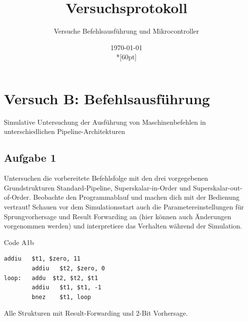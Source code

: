 \documentclass[a4paper,12pt,titlepage]{scrartcl}
\begin{document}
\titlehead
{
    \small
    {
        Technische Universität Ilmenau\\
        Fakulät IA\\
        Fachgebiet Rechnerarchitektur\\

        Praktikum Rechnerarchitektur 2\\
        WS 2021/22}
}

\title {Versuchsprotokoll}
\subtitle{Versuche Befehlsausführung und Mikrocontroller}
\author{}
\date{\today\\*[60pt]}
\maketitle  %

\pagestyle{fancy}
\newpage

\section*{Versuch B: Befehlsausführung}
Simulative Untersuchung der Ausführung von Maschinenbefehlen in unterschiedlichen Pipeline-Architekturen

\subsection*{Aufgabe 1}
Untersuchen die vorbereitete Befehlsfolge mit den drei vorgegebenen Grundstrukturen Standard-Pipeline, Superskalar-in-Order und Superskalar-out-of-Order. Beobachte den Programmablauf und machen dich mit der Bedienung vertraut! Schauen vor dem Simulationsstart auch die Parametereinstellungen für Sprungvorhersage und Result Forwarding an (hier können auch Änderungen vorgenommen werden) und interpretiere das Verhalten während der Simulation.

Code A1b
\begin{lstlisting}[basicstyle=\tiny]
        addiu   $t1, $zero, 11
        addiu   $t2, $zero, 0
loop:   addu  $t2, $t2, $t1
        addiu   $t1, $t1, -1
        bnez    $t1, loop
\end{lstlisting}
Alle Strukturen mit Result-Forwarding und 2-Bit Vorhersage.
\end{document}
